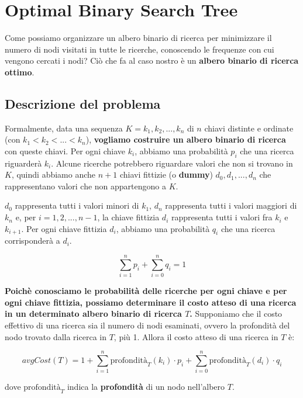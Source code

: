 \chapter{Optimal Binary Search Tree}

Come possiamo organizzare un albero binario di ricerca per minimizzare
il numero di nodi visitati in tutte le ricerche, conoscendo le frequenze
con cui vengono cercati i nodi? Ciò che fa al caso nostro è un
\textbf{albero binario di ricerca ottimo}.

\section{Descrizione del problema}

\begin{myblockquote}
  Formalmente, data una sequenza $K = k_1, k_2, ..., k_n$ di $n$
  chiavi distinte e ordinate (con $k_1 < k_2 < ... < k_n$),
  \textbf{vogliamo costruire un albero binario di ricerca} con queste
  chiavi. Per ogni chiave $k_i$, abbiamo una probabilità $p_i$ che una
  ricerca riguarderà $k_i$. Alcune ricerche potrebbero riguardare valori
  che non si trovano in $K$, quindi abbiamo anche $n+1$ chiavi
  fittizie (o \textbf{dummy}) $d_0, d_1, ..., d_n$ che rappresentano
  valori che non appartengono a $K$.
\end{myblockquote}

$d_0$ rappresenta tutti i valori minori di $k_1$, $d_n$
rappresenta tutti i valori maggiori di $k_n$ e, per
$i = 1, 2, ..., n-1$, la chiave fittizia $d_i$ rappresenta tutti i
valori fra $k_i$ e $k_{i+1}$. Per ogni chiave fittizia $d_i$,
abbiamo una probabilità $q_i$ che una ricerca corrisponderà a $d_i$.

$$
  \sum_{i=1}^{n} p_i +  \sum_{i=0}^{n} q_i = 1
$$

\textbf{Poichè conosciamo le probabilità delle ricerche per ogni chiave
  e per ogni chiave fittizia, possiamo determinare il costo atteso di una
  ricerca in un determinato albero binario di ricerca $T$.} Supponiamo
che il costo effettivo di una ricerca sia il numero di nodi esaminati,
ovvero la profondità del nodo trovato dalla ricerca in $T$, più 1.
Allora il costo atteso di una ricerca in $T$ è:

$$
  avgCost(T) = 1 + \sum_{i=1}^{n} \text{profondità}_T (k_i) \cdot p_i + \sum_{i = 0}^{n} \text{profondità}_T (d_i) \cdot q_i
$$

dove $\text{profondità}_T$ indica la \textbf{profondità} di un nodo
nell'albero $T$.



